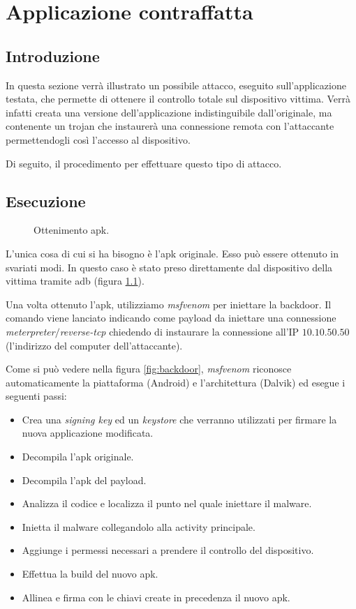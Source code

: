 \chapter{Applicazione contraffatta}

\section{Introduzione}

In questa sezione verrà illustrato un possibile attacco, eseguito sull'applicazione testata, che permette di ottenere il controllo totale sul dispositivo vittima. Verrà infatti creata una versione dell'applicazione indistinguibile dall'originale, ma contenente un trojan che instaurerà una connessione remota con l'attaccante permettendogli così l'accesso al dispositivo.

Di seguito, il procedimento per effettuare questo tipo di attacco.

\section{Esecuzione}

\begin{figure}[h]
	\centering
	\caption{Ottenimento apk.}
	\label{fig:apk}
\end{figure}

L'unica cosa di cui si ha bisogno è l'apk originale. Esso può essere ottenuto in svariati modi. In questo caso è stato preso direttamente dal dispositivo della vittima tramite adb (figura \ref{fig:apk}).

Una volta ottenuto l'apk, utilizziamo \emph{msfvenom}\cite{MSFVenom} per iniettare la backdoor. Il comando viene lanciato indicando come payload da iniettare una connessione \emph{meterpreter}$/$\emph{reverse-tcp} chiedendo di instaurare la connessione all'IP $10.10.50.50$ (l'indirizzo del computer dell'attaccante).

Come si può vedere nella figura \ref{fig:backdoor}, \emph{msfvenom} riconosce automaticamente la piattaforma (Android) e l'architettura (Dalvik) ed esegue i seguenti passi:

\begin{itemize}
	\item Crea una \emph{signing key} ed un \emph{keystore} che verranno utilizzati per firmare la nuova applicazione modificata.
	\item Decompila l'apk originale.
	\item Decompila l'apk del payload.
	\item Analizza il codice e localizza il punto nel quale iniettare il malware.
	\item Inietta il malware collegandolo alla activity principale.
	\item Aggiunge i permessi necessari a prendere il controllo del dispositivo.
	\item Effettua la build del nuovo apk.
	\item Allinea e firma con le chiavi create in precedenza il nuovo apk.
\end{itemize}

